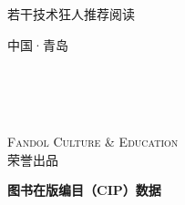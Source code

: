 \frontmatter
\pagestyle{empty}
\begin{titlepage}
    \textsf{ \huge 若干技术狂人推荐阅读 }
    \vspace{3cm}
    \begin{center}
    {\fontsize{40bp}{\baselineskip}\sffamily\bfseries \thetitle}

    \vspace{2cm}
    {\Huge {}}

    \vspace{1.6cm}
    {\huge {}}

    \vspace{12cm}

    {\huge \sffamily \thepublisher{}\quad 中国·青岛}
    \end{center}
\end{titlepage}

\cleardoublepage

\vspace*{3cm}
\begin{center}
    {\Huge \sffamily \thetitle\\[1em]}
    {\Large\bf\theauthors\\[2em]}
    \thedate\\
    \theversion
\end{center}

\vfill
\begin{center}
    \scshape{Fandol Culture \& Education}\\
    { \Large \sffamily { \bfseries \thepublisher} \quad 荣誉出品 }
\end{center}

\newpage
\vspace*{2cm}
\noindent\quad \textbf{图书在版编目（CIP）数据}
\vspace{1em}

